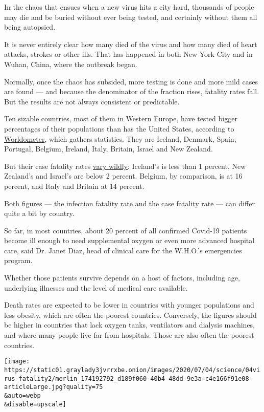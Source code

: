 In the chaos that ensues when a new virus hits a city hard, thousands of
people may die and be buried without ever being tested, and certainly
without them all being autopsied.

It is never entirely clear how many died of the virus and how many died
of heart attacks, strokes or other ills. That has happened in both New
York City and in Wuhan, China, where the outbreak began.

Normally, once the chaos has subsided, more testing is done and more
mild cases are found --- and because the denominator of the fraction
rises, fatality rates fall. But the results are not always consistent or
predictable.

Ten sizable countries, most of them in Western Europe, have tested
bigger percentages of their populations than has the United States,
according to
\href{https://www.worldometers.info/coronavirus/}{Worldometer}, which
gathers statistics. They are Iceland, Denmark, Spain, Portugal, Belgium,
Ireland, Italy, Britain, Israel and New Zealand.

But their case fatality rates
\href{https://fivethirtyeight.com/features/coronavirus-case-counts-are-meaningless/?campaign_id=9\&emc=edit_nn_20200605\&instance_id=19111\&nl=the-morning\&regi_id=3423762\&segment_id=30155\&te=1\&user_id=2f7d5ee538b6384a048aa9442c9b48c2}{vary
wildly}: Iceland's is less than 1 percent, New Zealand's and Israel's
are below 2 percent. Belgium, by comparison, is at 16 percent, and Italy
and Britain at 14 percent.

Both figures --- the infection fatality rate and the case fatality rate
--- can differ quite a bit by country.

So far, in most countries, about 20 percent of all confirmed Covid-19
patients become ill enough to need supplemental oxygen or even more
advanced hospital care, said Dr. Janet Diaz, head of clinical care for
the W.H.O.'s emergencies program.

Whether those patients survive depends on a host of factors, including
age, underlying illnesses and the level of medical care available.

Death rates are expected to be lower in countries with younger
populations and less obesity, which are often the poorest countries.
Conversely, the figures should be higher in countries that lack oxygen
tanks, ventilators and dialysis machines, and where many people live far
from hospitals. Those are also often the poorest countries.

\texttt{[image: https://static01.graylady3jvrrxbe.onion/images/2020/07/04/science/04virus-fatality2/merlin\_174192792\_d189f060-40b4-48dd-9e3a-c4e166f91e08-articleLarge.jpg?quality=75\\\&auto=webp\\\&disable=upscale]}

